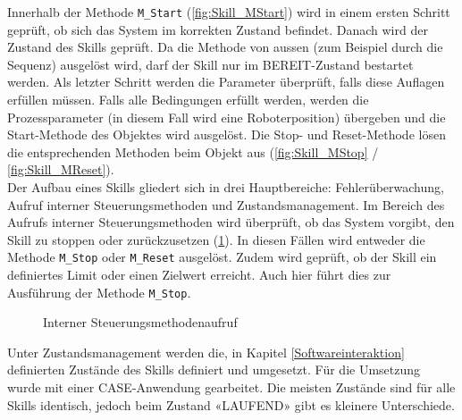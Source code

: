 		Innerhalb der Methode \verb|M_Start| (\ref{fig:Skill_MStart}) wird in einem ersten Schritt geprüft, ob sich das System im korrekten Zustand befindet. Danach wird der Zustand des Skills geprüft. Da die Methode von aussen (zum Beispiel durch die Sequenz) ausgelöst wird, darf der Skill nur im BEREIT-Zustand bestartet werden. Als letzter Schritt werden die Parameter überprüft, falls diese Auflagen erfüllen müssen. Falls alle Bedingungen erfüllt werden, werden die Prozessparameter (in diesem Fall wird eine Roboterposition) übergeben und die Start-Methode des Objektes wird ausgelöst. Die Stop- und Reset-Methode lösen die entsprechenden Methoden beim Objekt aus (\ref{fig:Skill_MStop} / \ref{fig:Skill_MReset}).
		\\
		Der Aufbau eines Skills gliedert sich in drei Hauptbereiche: Fehlerüberwachung, Aufruf interner Steuerungsmethoden und Zustandsmanagement. Im Bereich des Aufrufs interner Steuerungsmethoden wird überprüft, ob das System vorgibt, den Skill zu stoppen oder zurückzusetzen (\ref{fig:Methodenaufruf}). In diesen Fällen wird entweder die Methode \verb|M_Stop| oder \verb|M_Reset| ausgelöst. Zudem wird geprüft, ob der Skill ein definiertes Limit oder einen Zielwert erreicht. Auch hier führt dies zur Ausführung der Methode \verb|M_Stop|.
		
		\begin{figure}[h!]
			\centering
			\captionsetup{justification=centering}
			\caption{Interner Steuerungsmethodenaufruf}
			\label{fig:Methodenaufruf}
		\end{figure}
		
		\newpage
		
		Unter Zustandsmanagement werden die, in Kapitel \ref{Softwareinteraktion} definierten Zustände des Skills definiert und umgesetzt. Für die Umsetzung wurde mit einer CASE-Anwendung gearbeitet.  Die meisten Zustände sind für alle Skills identisch, jedoch beim Zustand «LAUFEND» gibt es kleinere Unterschiede. 
		
